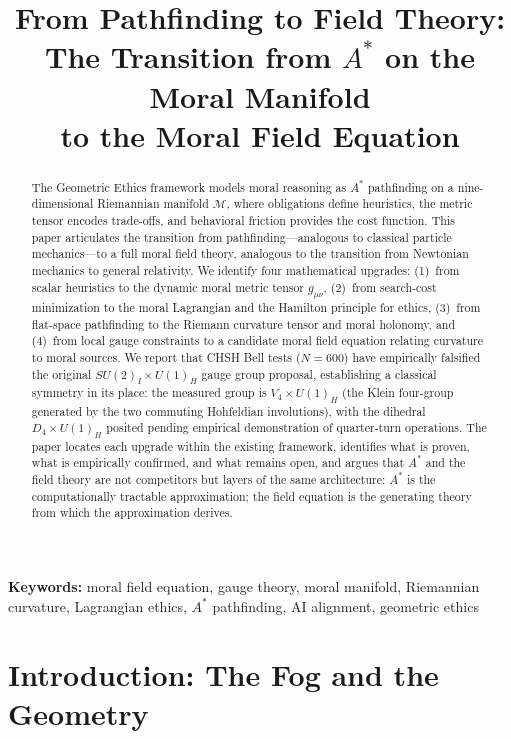 \documentclass[12pt]{article}
\title{\textbf{From Pathfinding to Field Theory:\\The Transition from $A^*$ on the Moral Manifold\\to the Moral Field Equation}}
\author{}
\date{}
\theoremstyle{definition}
\theoremstyle{remark}
\newcommand{\M}{\mathcal{M}}
\begin{document}
\maketitle

\begin{abstract}
The Geometric Ethics framework models moral reasoning as $A^*$ pathfinding on a nine-dimensional Riemannian manifold $\M$, where obligations define heuristics, the metric tensor encodes trade-offs, and behavioral friction provides the cost function. This paper articulates the transition from pathfinding---analogous to classical particle mechanics---to a full moral field theory, analogous to the transition from Newtonian mechanics to general relativity. We identify four mathematical upgrades: (1)~from scalar heuristics to the dynamic moral metric tensor $g_{\mu\nu}$, (2)~from search-cost minimization to the moral Lagrangian and the Hamilton principle for ethics, (3)~from flat-space pathfinding to the Riemann curvature tensor and moral holonomy, and (4)~from local gauge constraints to a candidate moral field equation relating curvature to moral sources. We report that CHSH Bell tests ($N = 600$) have empirically falsified the original $SU(2)_I \times U(1)_H$ gauge group proposal, establishing a classical symmetry in its place: the measured group is $V_4 \times U(1)_H$ (the Klein four-group generated by the two commuting Hohfeldian involutions), with the dihedral $D_4 \times U(1)_H$ posited pending empirical demonstration of quarter-turn operations. The paper locates each upgrade within the existing framework, identifies what is proven, what is empirically confirmed, and what remains open, and argues that $A^*$ and the field theory are not competitors but layers of the same architecture: $A^*$ is the computationally tractable approximation; the field equation is the generating theory from which the approximation derives.
\end{abstract}

\noindent\textbf{Keywords:} moral field equation, gauge theory, moral manifold, Riemannian curvature, Lagrangian ethics, $A^*$ pathfinding, AI alignment, geometric ethics

\section{Introduction: The Fog and the Geometry}
\label{sec:introduction}
\end{document}
